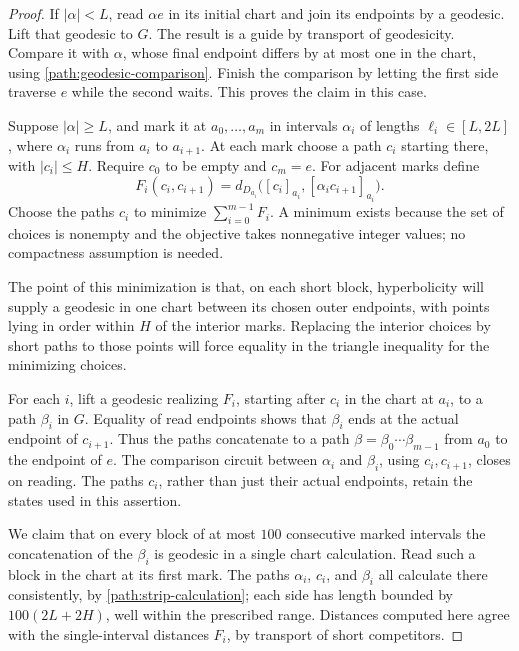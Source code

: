 \documentclass[11pt,reqno]{amsart}
\numberwithin{equation}{section}
\theoremstyle{definition}
\theoremstyle{remark}
\begin{document}
\begin{proof}
If $|\alpha|<L$, read $\alpha e$ in its initial chart and join its
endpoints by a geodesic.  Lift that geodesic to $G$.  The result is a
guide by transport of geodesicity.  Compare it with $\alpha$, whose
final endpoint differs by at most one in the chart, using
\eqref{path:geodesic-comparison}.  Finish the comparison by letting the
first side traverse $e$ while the second waits.  This proves the claim
in this case.

Suppose $|\alpha|\ge L$, and mark it at
$a_0,\ldots,a_m$ in intervals $\alpha_i$ of lengths
$\ell_i\in[L,2L]$, where $\alpha_i$ runs from $a_i$ to $a_{i+1}$.
At each mark choose a path $c_i$ starting there, with $|c_i|\le H$.
Require $c_0$ to be empty and $c_m=e$.  For adjacent marks define
\[
 F_i(c_i,c_{i+1})=
 d_{D_{a_i}}\bigl([c_i]_{a_i},[\alpha_i c_{i+1}]_{a_i}\bigr).
\]
Choose the paths $c_i$ to minimize $\sum_{i=0}^{m-1}F_i$.  A minimum
exists because the set of choices is nonempty and the objective takes
nonnegative integer values; no compactness assumption is needed.

The point of this minimization is that, on each short block,
hyperbolicity will supply a geodesic in one chart between its chosen
outer endpoints, with points lying in order within $H$ of the interior
marks.  Replacing the interior choices by short paths to those points
will force equality in the triangle inequality for the minimizing
choices.

For each $i$, lift a geodesic realizing $F_i$, starting after $c_i$ in
the chart at $a_i$, to a path $\beta_i$ in $G$.  Equality of read
endpoints shows that $\beta_i$ ends at the actual endpoint of $c_{i+1}$.
Thus the paths concatenate to a path
$\beta=\beta_0\cdots\beta_{m-1}$ from $a_0$ to the endpoint of $e$.
The comparison circuit between $\alpha_i$ and $\beta_i$, using
$c_i,c_{i+1}$, closes on reading.  The paths $c_i$, rather than just
their actual endpoints, retain the states used in this assertion.

We claim that on every block of at most $100$ consecutive marked
intervals the concatenation of the $\beta_i$ is geodesic in a single
chart calculation.  Read such a block in the chart at its first mark.
The paths $\alpha_i$, $c_i$, and $\beta_i$ all calculate there
consistently, by \eqref{path:strip-calculation}; each side has length
bounded by $100(2L+2H)$, well within the prescribed range.  Distances
computed here agree with the single-interval distances $F_i$, by
transport of short competitors.


\end{proof}
\end{document}
